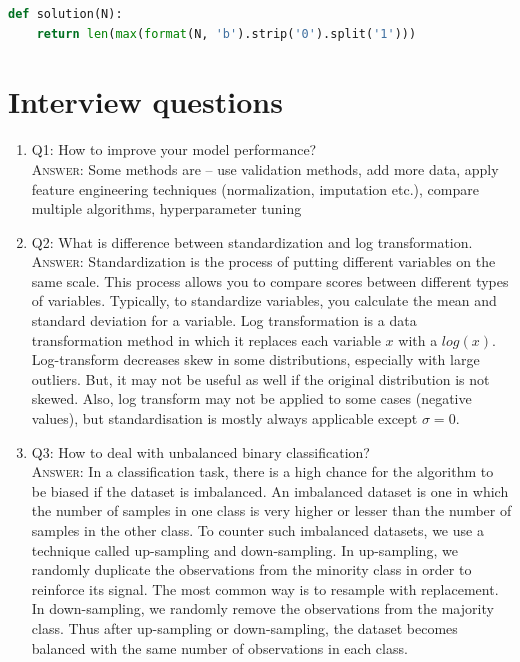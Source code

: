 \documentclass[11pt]{article}
\begin{document}
\begin{mdframed}[backgroundcolor=celadon!6]
\begin{lstlisting}[language=Python]
def solution(N):
    return len(max(format(N, 'b').strip('0').split('1'))) 
\end{lstlisting}
   \end{mdframed} 
   
   
   
   


\section{Interview questions}

\begin{enumerate}

\item Q1: How to improve your model performance?  \\
\textsc{Answer:} Some methods are -- use validation methods, add more data, apply feature engineering techniques (normalization, imputation etc.), compare multiple algorithms, hyperparameter tuning 

\item Q2: What is difference between standardization and log transformation. \\
\textsc{Answer:} Standardization is the process of putting different variables on the same scale. This process allows you to compare scores between different types of variables. Typically, to standardize variables, you calculate the mean and standard deviation for a variable. Log transformation is a data transformation method in which it replaces each variable $x$ with a $log(x)$. Log-transform decreases skew in some distributions, especially with large outliers. But, it may not be useful as well if the original distribution is not skewed. Also, log transform may not be applied to some cases (negative values), but standardisation is mostly always applicable except $\sigma = 0$. 

\item Q3: How to deal with unbalanced binary classification? \\
\textsc{Answer:} In a classification task, there is a high chance for the algorithm to be biased if the dataset is imbalanced. An imbalanced dataset is one in which the number of samples in one class is very higher or lesser than the number of samples in the other class. 
To counter such imbalanced datasets, we use a technique called up-sampling and down-sampling. In up-sampling, we randomly duplicate the observations from the minority class in order to reinforce its signal. The most common way is to resample with replacement. In down-sampling, we randomly remove the observations from the majority class. Thus after up-sampling or down-sampling, the dataset becomes balanced with the same number of observations in each class.


\end{enumerate}
\end{document}
